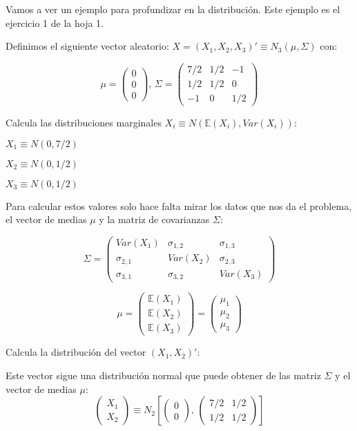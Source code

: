 Vamos a ver un ejemplo para profundizar en la distribución. Este ejemplo es el ejercicio 1 de la hoja 1. 
\begin{example}
Definimos el siguiente vector aleatorio: $X = (X_1,X_2,X_3)' \equiv N_3(\mu, \Sigma)$ con:

\[
\mu=
\left(
\begin{array}{c}
0\\
0\\
0
\end{array}
\right) \text{,       }
\Sigma=
\left(
\begin{array}{ccc}
7/2& 1/2& -1 \\
1/2& 1/2& 0 \\
-1& 0& 1/2
\end{array}
\right)
\]

\ppart Calcula las distribuciones marginales $X_i \equiv N(\mathbb{E}(X_i), Var(X_i))$:

$X_1\equiv N(0, 7/2)$

$X_2\equiv N(0, 1/2)$

$X_3\equiv N(0, 1/2)$

Para calcular estos valores solo hace falta mirar los datos que nos da el problema, el vector de medias $\mu$ y la matriz de covarianzas $\Sigma$:

\[
\Sigma=\left(
\begin{array}{ccc}
Var(X_1)& \sigma_{1,2}& \sigma_{1,3} \\
\sigma_{2,1}& Var(X_2)& \sigma_{2,3} \\
\sigma_{3,1}& \sigma_{3,2}& Var(X_3)
\end{array}
\right)
\]

\[
\mu=
\left(
\begin{array}{c}
\mathbb{E}(X_1)\\
\mathbb{E}(X_2)\\
\mathbb{E}(X_3)
\end{array}
\right)=
\left(
\begin{array}{c}
\mu_1\\
\mu_2\\
\mu_3
\end{array}
\right)
\]

\ppart Calcula la distribución del vector $(X_1,X_2)'$:

Este vector sigue una distribución normal que puede obtener de las matriz $\Sigma$ y el vector de medias $\mu$:
\[
\left(
\begin{array}{c}
X_1\\
X_2
\end{array}
\right)
\equiv N_2\left[
\left(
\begin{array}{c}
0\\
0
\end{array}
\right)
\text{, }
\left(
\begin{array}{cc}
7/2& 1/2 \\
1/2 & 1/2
\end{array}
\right)
\right]
\]


\end{example}
